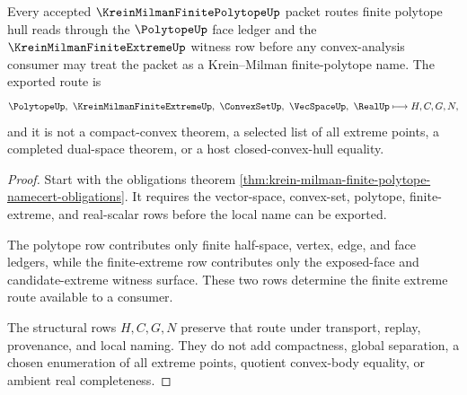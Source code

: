 \begin{theorem}
\label{thm:krein-milman-finite-polytope-extreme-route}
Every accepted $\KreinMilmanFinitePolytopeUp$ packet routes finite polytope hull reads through the $\PolytopeUp$ face ledger and the $\KreinMilmanFiniteExtremeUp$ witness row before any convex-analysis consumer may treat the packet as a Krein--Milman finite-polytope name. The exported route is
$$
\PolytopeUp,\ \KreinMilmanFiniteExtremeUp,\ \ConvexSetUp,\ \VecSpaceUp,\ \RealUp
\longmapsto H,C,G,N,
$$
and it is not a compact-convex theorem, a selected list of all extreme points, a completed dual-space theorem, or a host closed-convex-hull equality.
\end{theorem}
\begin{proof}
Start with the obligations theorem \autoref{thm:krein-milman-finite-polytope-namecert-obligations}. It requires the vector-space, convex-set, polytope, finite-extreme, and real-scalar rows before the local name can be exported.

The polytope row contributes only finite half-space, vertex, edge, and face ledgers, while the finite-extreme row contributes only the exposed-face and candidate-extreme witness surface. These two rows determine the finite extreme route available to a consumer.

The structural rows $H,C,G,N$ preserve that route under transport, replay, provenance, and local naming. They do not add compactness, global separation, a chosen enumeration of all extreme points, quotient convex-body equality, or ambient real completeness.
\end{proof}


\begin{closurestatus}{\KreinMilmanFinitePolytopeUp}
  \theoryclosure{\seedClosure}
  \formalstatus{\unformalizedV}
\end{closurestatus}
